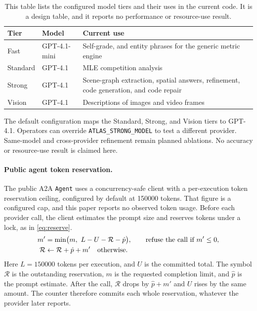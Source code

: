 \documentclass{article}
\begin{document}
\begin{table}[t]
\centering
\caption{This table lists the configured model tiers and their uses in the current code. It is a design table, and it reports no performance or resource-use result.}
\label{tab:model_tiers}
\begin{tabular}{@{}ll>{\raggedright\arraybackslash}p{7.4cm}@{}}
\toprule
\textbf{Tier} & \textbf{Model} & \textbf{Current use} \\
\midrule
Fast     & GPT-4.1-mini & Self-grade, and entity phrases for the generic metric engine \\
Standard & GPT-4.1      & MLE competition analysis \\
Strong   & GPT-4.1      & Scene-graph extraction, spatial answers, refinement, code generation, and code repair \\
Vision   & GPT-4.1      & Descriptions of images and video frames \\
\bottomrule
\end{tabular}
\end{table}

The default configuration maps the Standard, Strong, and Vision tiers to GPT-4.1. Operators can override \texttt{ATLAS\_STRONG\_MODEL} to test a different provider. Same-model and cross-provider refinement remain planned ablations. No accuracy or resource-use result is claimed here.

\paragraph{Public agent token reservation.}
The public A2A \texttt{Agent} uses a concurrency-safe client with a per-execution token reservation ceiling, configured by default at \num{150000} tokens. That figure is a configured cap, and this paper reports no observed token usage. Before each provider call, the client estimates the prompt size and reserves tokens under a lock, as in \cref{eq:reserve}.
\begin{align}
  m' &= \min\bigl(m,\ L - U - \mathcal{R} - \hat{p}\bigr), \qquad \text{refuse the call if } m' \le 0, \notag\\
  \mathcal{R} &\leftarrow \mathcal{R} + \hat{p} + m' \quad \text{otherwise}. \label{eq:reserve}
\end{align}
Here $L = \num{150000}$ tokens per execution, and $U$ is the committed total. The symbol $\mathcal{R}$ is the outstanding reservation, $m$ is the requested completion limit, and $\hat{p}$ is the prompt estimate. After the call, $\mathcal{R}$ drops by $\hat{p} + m'$ and $U$ rises by the same amount. The counter therefore commits each whole reservation, whatever the provider later reports.
\end{document}
